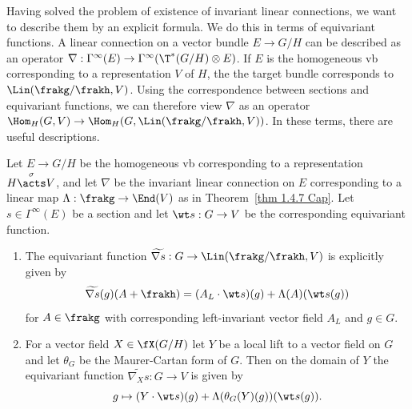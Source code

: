 Having solved the problem of existence of invariant linear connections, we want to describe them by an explicit formula. We do this in terms of equivariant functions. A linear connection on a vector bundle $E\to G\slash H$ can be described as an operator $\nabla:\Gamma^\infty(E)\to \Gamma^\infty(\T^\ast(G\slash H)\otimes E)$. If $E$ is the homogeneous \gls{vb} corresponding to a representation $V$ of $H$, the the target bundle corresponds to $\Lin(\frakg\slash\frakh,V)$. Using the correspondence between sections and equivariant functions, we can therefore view $\nabla$ as an operator $\Hom_H(G,V)\to \Hom_H(G,\Lin(\frakg\slash\frakh,V))$. In these terms, there are useful descriptions.

\begin{prop}\label{prop 1.4.7 Cap}
    Let $E\to G\slash H$ be the homogeneous \gls{vb} corresponding to a representation $H\overset{\sigma}{\acts}V$, and let $\nabla$ be the invariant linear connection on $E$ corresponding to a linear map $\Lambda:\frakg\to \End(V)$ as in Theorem~\ref{thm 1.4.7 Cap}. Let $s\in\Gamma^\infty(E)$ be a section and let $\wt s:G\to V$ be the corresponding equivariant function.

    \begin{enumerate}[label=(\arabic*)]
        \item The equivariant function $\widetilde{\nabla s}:G\to \Lin(\frakg\slash\frakh,V)$ is explicitly given by 
        \[\widetilde{\nabla s}(g)(A+\frakh)=(A_L\cdot \wt s)(g)+\Lambda(A)(\wt s(g))\]
        for $A\in\frakg$ with corresponding left-invariant vector field $A_L$ and $g\in G$.
        \item For a vector field $X\in\fX(G\slash H)$ let $Y$ be a local lift to a vector field on $G$ and let $\theta_G$ be the Maurer-Cartan form of $G$. Then on the domain of $Y$ the equivariant function $\widetilde{\nabla_X s}:G\to V$ is given by 
        \[g\mapsto (Y\cdot \wt s)(g)+\Lambda(\theta_G(Y)(g))(\wt s(g)).\]
    \end{enumerate}
\end{prop}
